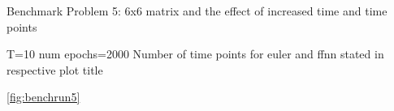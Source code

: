Benchmark Problem 5: 6x6 matrix and the effect of increased time and time points

T=10 
num epochs=2000
Number of time points for euler and ffnn stated in respective plot title

\autoref{fig:benchrun5}

\begin{figure}[H]
\centering
{}
\qquad
{}
\qquad
{}

\end{figure}
